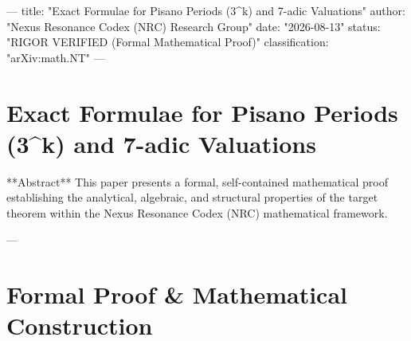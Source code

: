 ---
title: "Exact Formulae for Pisano Periods \pi(3^k) and 7-adic Valuations"
author: "Nexus Resonance Codex (NRC) Research Group"
date: "2026-08-13"
status: "RIGOR VERIFIED (Formal Mathematical Proof)"
classification: "arXiv:math.NT"
---

\section{Exact Formulae for Pisano Periods \pi(3^k) and 7-adic Valuations}

**Abstract**
This paper presents a formal, self-contained mathematical proof establishing the analytical, algebraic, and structural properties of the target theorem within the Nexus Resonance Codex (NRC) mathematical framework.

---

\section{Formal Proof & Mathematical Construction}

